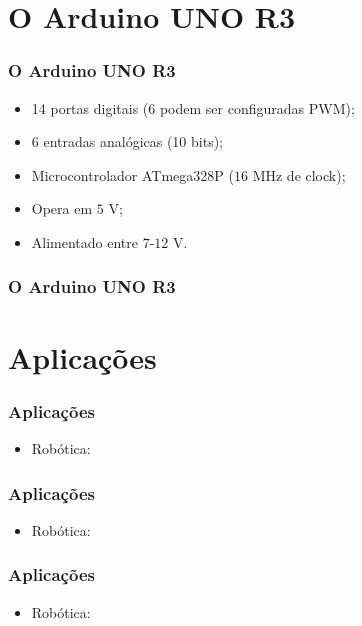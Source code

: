 \documentclass{beamer}
\begin{document}
\section{O Arduino UNO R3}
\begin{frame}
	\frametitle{O Arduino UNO R3}
	\begin{itemize}
		\item 14 portas digitais (6 podem ser configuradas PWM);
		\item 6 entradas analógicas (10 bits);
		\item Microcontrolador ATmega328P ($16$ MHz de clock);
		\item Opera em $5$ V;
		\item Alimentado entre $7$-$12$ V.
	\end{itemize}
\end{frame}

\begin{frame}
	\frametitle{O Arduino UNO R3}
	\begin{center}
	\end{center}
\end{frame}

\section{Aplicações}
\begin{frame}
	\frametitle{Aplicações}
	\begin{itemize}
	\item Robótica:
	\end{itemize}
	\begin{center}
	\end{center}
\end{frame}

\begin{frame}
	\frametitle{Aplicações}
	\begin{itemize}
	\item Robótica:
	\end{itemize}
	\begin{center}
	\end{center}
\end{frame}

\begin{frame}
	\frametitle{Aplicações}
	\begin{itemize}
	\item Robótica:
	\end{itemize}
	\begin{center}
	\end{center}
\end{frame}
\end{document}
